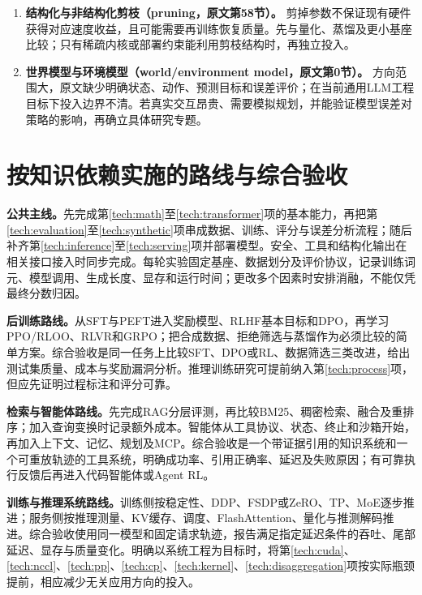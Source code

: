 \documentclass[UTF8,12pt,a4paper,fontset=fandol]{ctexart}
\begin{document}
\begin{enumerate}[resume=techrank]
\item \textbf{结构化与非结构化剪枝（pruning，原文第58节）。}\label{tech:pruning}
剪掉参数不保证现有硬件获得对应速度收益，且可能需要再训练恢复质量。先与量化、蒸馏及更小基座比较；只有稀疏内核或部署约束能利用剪枝结构时，再独立投入。

\item \textbf{世界模型与环境模型（world/environment model，原文第0节）。}\label{tech:world}
方向范围大，原文缺少明确状态、动作、预测目标和误差评价；在当前通用LLM工程目标下投入边界不清。若真实交互昂贵、需要模拟规划，并能验证模型误差对策略的影响，再确立具体研究专题。
\end{enumerate}

\section{按知识依赖实施的路线与综合验收}
\label{sec:route}

\textbf{公共主线。}先完成第\ref{tech:math}至\ref{tech:transformer}项的基本能力，再把第\ref{tech:evaluation}至\ref{tech:synthetic}项串成数据、训练、评分与误差分析流程；随后补齐第\ref{tech:inference}至\ref{tech:serving}项并部署模型。安全、工具和结构化输出在相关接口接入时同步完成。每轮实验固定基座、数据划分及评价协议，记录训练词元、模型调用、生成长度、显存和运行时间；更改多个因素时安排消融，不能仅凭最终分数归因。

\textbf{后训练路线。}从SFT与PEFT进入奖励模型、RLHF基本目标和DPO，再学习PPO/RLOO、RLVR和GRPO；把合成数据、拒绝筛选与蒸馏作为必须比较的简单方案。综合验收是同一任务上比较SFT、DPO或RL、数据筛选三类改进，给出测试集质量、成本与奖励漏洞分析。推理训练研究可提前纳入第\ref{tech:process}项，但应先证明过程标注和评分可靠。

\textbf{检索与智能体路线。}先完成RAG分层评测，再比较BM25、稠密检索、融合及重排序；加入查询变换时记录额外成本。智能体从工具协议、状态、终止和沙箱开始，再加入上下文、记忆、规划及MCP。综合验收是一个带证据引用的知识系统和一个可重放轨迹的工具系统，明确成功率、引用正确率、延迟及失败原因；有可靠执行反馈后再进入代码智能体或Agent RL。

\textbf{训练与推理系统路线。}训练侧按稳定性、DDP、FSDP或ZeRO、TP、MoE逐步推进；服务侧按推理测量、KV缓存、调度、FlashAttention、量化与推测解码推进。综合验收使用同一模型和固定请求轨迹，报告满足指定延迟条件的吞吐、尾部延迟、显存与质量变化。明确以系统工程为目标时，将第\ref{tech:cuda}、\ref{tech:nccl}、\ref{tech:pp}、\ref{tech:cp}、\ref{tech:kernel}、\ref{tech:disaggregation}项按实际瓶颈提前，相应减少无关应用方向的投入。
\end{document}
